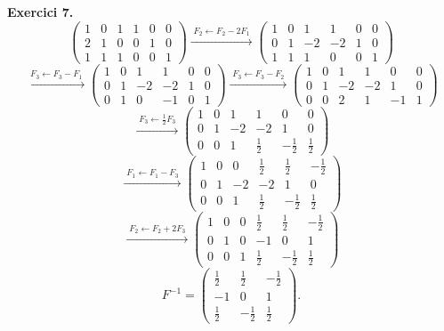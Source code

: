 \documentclass[12pt,a4paper]{article}
\newcommand{\blocInici}{%
  \par\nobreak\vspace{0pt}%
  \begin{minipage}[t]{\linewidth}%
}
\newcommand{\blocFi}{%
  \end{minipage}%
  \par
}
\newcommand{\gaussFletxa}[1]{%
  \mathrel{\xrightarrow{\;\scriptstyle #1\;}}%
}
\begin{document}
\vspace{0.5em}

%
\blocInici
\noindent\textbf{Exercici 7.}
{\setlength{\arraycolsep}{2pt}%
\[
  \left(\begin{array}{ccc|ccc}
    1 & 0 & 1 & 1 & 0 & 0 \\
    2 & 1 & 0 & 0 & 1 & 0 \\
    1 & 1 & 1 & 0 & 0 & 1
  \end{array}\right)
  \gaussFletxa{F_2 \leftarrow F_2 - 2F_1}
  \left(\begin{array}{ccc|ccc}
    1 & 0 & 1 & 1 & 0 & 0 \\
    0 & 1 & -2 & -2 & 1 & 0 \\
    1 & 1 & 1 & 0 & 0 & 1
  \end{array}\right)
\]
\[
  \gaussFletxa{F_3 \leftarrow F_3 - F_1}
  \left(\begin{array}{ccc|ccc}
    1 & 0 & 1 & 1 & 0 & 0 \\
    0 & 1 & -2 & -2 & 1 & 0 \\
    0 & 1 & 0 & -1 & 0 & 1
  \end{array}\right)
  \gaussFletxa{F_3 \leftarrow F_3 - F_2}
  \left(\begin{array}{ccc|ccc}
    1 & 0 & 1 & 1 & 0 & 0 \\
    0 & 1 & -2 & -2 & 1 & 0 \\
    0 & 0 & 2 & 1 & -1 & 1
  \end{array}\right)
\]
\[
  \gaussFletxa{F_3 \leftarrow \tfrac{1}{2}F_3}
  \left(\begin{array}{ccc|ccc}
    1 & 0 & 1 & 1 & 0 & 0 \\
    0 & 1 & -2 & -2 & 1 & 0 \\
    0 & 0 & 1 & \tfrac{1}{2} & -\tfrac{1}{2} & \tfrac{1}{2}
  \end{array}\right)
\]
\[
  \gaussFletxa{F_1 \leftarrow F_1 - F_3}
  \left(\begin{array}{ccc|ccc}
    1 & 0 & 0 & \tfrac{1}{2} & \tfrac{1}{2} & -\tfrac{1}{2} \\
    0 & 1 & -2 & -2 & 1 & 0 \\
    0 & 0 & 1 & \tfrac{1}{2} & -\tfrac{1}{2} & \tfrac{1}{2}
  \end{array}\right)
\]
\[
  \gaussFletxa{F_2 \leftarrow F_2 + 2F_3}
  \left(\begin{array}{ccc|ccc}
    1 & 0 & 0 & \tfrac{1}{2} & \tfrac{1}{2} & -\tfrac{1}{2} \\
    0 & 1 & 0 & -1 & 0 & 1 \\
    0 & 0 & 1 & \tfrac{1}{2} & -\tfrac{1}{2} & \tfrac{1}{2}
  \end{array}\right)
\]
}
\[
  F^{-1} =
  \begin{pmatrix}
    \tfrac{1}{2} & \tfrac{1}{2} & -\tfrac{1}{2} \\
    -1 & 0 & 1 \\
    \tfrac{1}{2} & -\tfrac{1}{2} & \tfrac{1}{2}
  \end{pmatrix}.
\]
\blocFi
\end{document}
